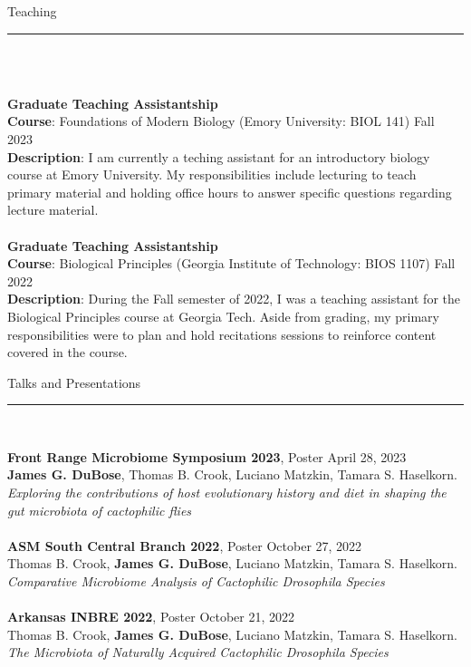 \documentclass{article}
\begin{document}
\begin{flushleft}
{\Large Teaching} \rule{16.51cm}{0.4pt}\\
\end{flushleft}
\\
\textbf{Graduate Teaching Assistantship}\\
\textbf{Course}: Foundations of Modern Biology (Emory University: BIOL 141) \hfill Fall 2023\\
\textbf{Description}: I am currently a teching assistant for an introductory biology course at Emory University.
My responsibilities include lecturing to teach primary material and holding office hours to answer specific
questions regarding lecture material. 
\\
\\
\textbf{Graduate Teaching Assistantship}\\
\textbf{Course}: Biological Principles (Georgia Institute of Technology: BIOS 1107) \hfill Fall 2022\\
\textbf{Description}: During the Fall semester of 2022, I was a teaching assistant for the Biological 
Principles course at Georgia Tech. Aside from grading, my primary responsibilities were to plan and 
hold recitations sessions to reinforce content covered in the course.
\\
\begin{flushleft}
{\Large Talks and Presentations} \rule{16.51cm}{0.4pt}\\
\end{flushleft}
\textbf{Front Range Microbiome Symposium 2023}, Poster \hfill April 28, 2023\\
\textbf{James G. DuBose}, Thomas B. Crook, Luciano Matzkin, Tamara S. Haselkorn. \emph{Exploring the contributions of host evolutionary history and diet in shaping the gut microbiota of cactophilic flies}\\
\\
\textbf{ASM South Central Branch 2022}, Poster \hfill October 27, 2022\\
Thomas B. Crook, \textbf{James G. DuBose}, Luciano Matzkin, Tamara S. Haselkorn. \emph{Comparative Microbiome Analysis of Cactophilic Drosophila Species}\\
\\
\textbf{Arkansas INBRE 2022}, Poster \hfill October 21, 2022\\
Thomas B. Crook, \textbf{James G. DuBose}, Luciano Matzkin, Tamara S. Haselkorn. \emph{The Microbiota of Naturally Acquired Cactophilic Drosophila Species}\\
\end{document}
